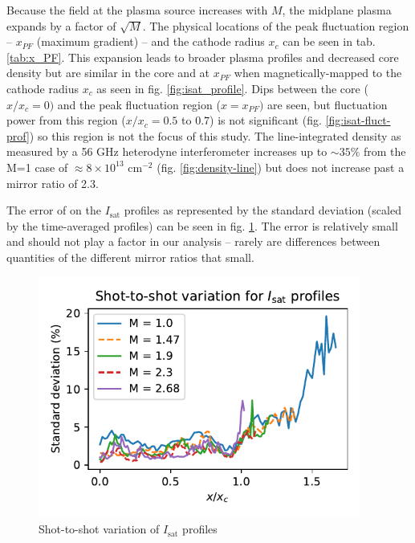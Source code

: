 Because the field at the plasma source increases with $M$, the midplane plasma expands by a factor of $\sqrt{M}$. The physical locations of the peak fluctuation region -- $x_{PF}$ (maximum gradient) -- and the cathode radius $x_c$ can be seen in tab. \ref{tab:x_PF}. This expansion leads to broader plasma profiles and decreased core density but are similar in the core and at $x_{PF}$ when magnetically-mapped to the cathode radius $x_c$ as seen in fig. \ref{fig:isat_profile}. Dips between the core ($x/x_c=0)$ and the peak fluctuation region ($x=x_{PF})$ are seen, but fluctuation power from this region ($x/x_c = 0.5$ to $0.7$) is not significant (fig. \ref{fig:isat-fluct-prof}) so this region is not the focus of this study. The line-integrated density as measured by a 56 GHz heterodyne interferometer increases up to $\sim 35\%$ from the M=1 case of $\approx8 \times 10^{13}$ cm$^{-2}$ (fig. \ref{fig:density-line}) but does not increase past a mirror ratio of 2.3.

The error of on the $I_\text{sat}$ profiles as represented by the standard deviation (scaled by the time-averaged profiles) can be seen in fig. \ref{fig_extra:isat-profile-stddev}. The error is relatively small and should not play a factor in our analysis -- rarely are differences between quantities of the different mirror ratios that small.

\begin{figure}
    \centering
    \includegraphics[width=300pt]{figures/extra/isat-profile-stddev.pdf}
    \caption[Shot-to-shot variation of $I_\text{sat}$ profiles]{Shot-to-shot variation of $I_\text{sat}$ profiles}
    \label{fig_extra:isat-profile-stddev}
\end{figure}


